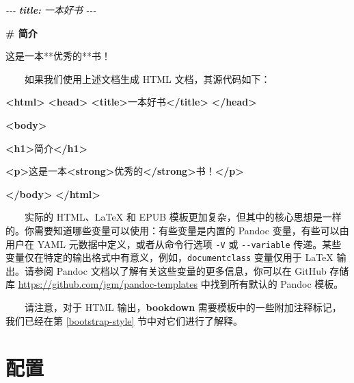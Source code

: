\documentclass[
  12pt,
]{krantz}
\newenvironment{Shaded}{\begin{snugshade}}{\end{snugshade}}
\newcommand{\AnnotationTok}[1]{\textcolor[rgb]{0.56,0.35,0.01}{\textbf{\textit{#1}}}}
\newcommand{\CommentTok}[1]{\textcolor[rgb]{0.56,0.35,0.01}{\textit{#1}}}
\newcommand{\FunctionTok}[1]{\textcolor[rgb]{0.13,0.29,0.53}{\textbf{#1}}}
\newcommand{\KeywordTok}[1]{\textcolor[rgb]{0.13,0.29,0.53}{\textbf{#1}}}
\newcommand{\NormalTok}[1]{#1}
\theoremstyle{definition}
\theoremstyle{definition}
\theoremstyle{definition}
\theoremstyle{definition}
\theoremstyle{remark}
\begin{document}
\begin{Shaded}
\begin{Highlighting}[]
\CommentTok{{-}{-}{-}}
\AnnotationTok{title:}\CommentTok{ 一本好书}
\CommentTok{{-}{-}{-}}

\FunctionTok{\# 简介}

\NormalTok{这是一本**优秀的**书！}
\end{Highlighting}
\end{Shaded}

  如果我们使用上述文档生成 HTML 文档，其源代码如下：

\begin{Shaded}
\begin{Highlighting}[]
\KeywordTok{\textless{}html\textgreater{}}
  \KeywordTok{\textless{}head\textgreater{}}
    \KeywordTok{\textless{}title\textgreater{}}\NormalTok{一本好书}\KeywordTok{\textless{}/title\textgreater{}}
  \KeywordTok{\textless{}/head\textgreater{}}
  
  \KeywordTok{\textless{}body\textgreater{}}
  
  \KeywordTok{\textless{}h1\textgreater{}}\NormalTok{简介}\KeywordTok{\textless{}/h1\textgreater{}}
  
  \KeywordTok{\textless{}p\textgreater{}}\NormalTok{这是一本}\KeywordTok{\textless{}strong\textgreater{}}\NormalTok{优秀的}\KeywordTok{\textless{}/strong\textgreater{}}\NormalTok{书！}\KeywordTok{\textless{}/p\textgreater{}}
  
  \KeywordTok{\textless{}/body\textgreater{}}
\KeywordTok{\textless{}/html\textgreater{}}
\end{Highlighting}
\end{Shaded}

  实际的 HTML、LaTeX 和 EPUB 模板更加复杂，但其中的核心思想是一样的。你需要知道哪些变量可以使用：有些变量是内置的 Pandoc 变量，有些可以由用户在 YAML 元数据中定义，或者从命令行选项 \texttt{-V} 或 \texttt{-\/-variable} 传递。某些变量仅在特定的输出格式中有意义，例如，\texttt{documentclass} 变量仅用于 LaTeX 输出。请参阅 Pandoc 文档以了解有关这些变量的更多信息，你可以在 GitHub 存储库 \url{https://github.com/jgm/pandoc-templates} 中找到所有默认的 Pandoc 模板。

  请注意，对于 HTML 输出，\textbf{bookdown} 需要模板中的一些附加注释标记，我们已经在第 \ref{bootstrap-style} 节中对它们进行了解释。

\hypertarget{configuration}{%
\section{配置}\label{configuration}}
\end{document}
